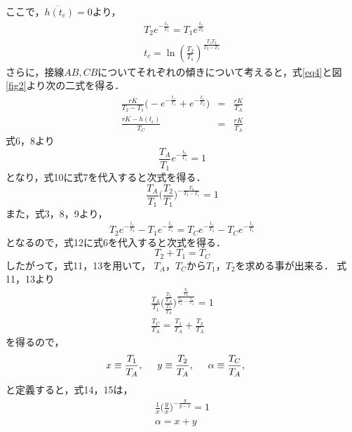 \documentclass[11pt,a4paper]{jsarticle}
\begin{document}
ここで，$\ddot{h(t_c)} = 0$より，
\begin{eqnarray}
 T_2 e^{-\frac{t_c}{T_1}} = T_1 e^{\frac{t_c}{T_2}} \\ \label{eq6}
t_c = \ln{(\frac{T_2}{T_1})}^{\frac{T_1 T_2}{T_2 - T_1}}
\end{eqnarray}
さらに，接線$AB, CB$についてそれぞれの傾きについて考えると，式\ref{eq4}と図\ref{fig2}より次の二式を得る．
\begin{eqnarray}
  \frac{r K}{T_2 - T_1} \biggl( - e^{- \frac{t_c}{T_1}} + e^{- \frac{t_c}{T_2}} \biggr) &=& \frac{r K}{T_A} \\
  \frac{r K - h(t_c)}{T_C} &=& \frac{r K}{T_A}
\end{eqnarray}
式6，8より
\begin{equation}
  \frac{T_A}{T_1} e^{- \frac{t_c}{T_1}} = 1
\end{equation}
となり，式10に式7を代入すると次式を得る．
\begin{equation}
  \frac{T_A}{T_1} \biggl( \frac{T_2}{T_1} \biggr) ^{- \frac{T_2}{T_2 - T_1}} = 1
\end{equation}
また，式3，8，9より，
\begin{equation}
  T_2 e^{- \frac{t_c}{T_2}} - T_1 e^{- \frac{t_c}{T_1}} = T_C e^{- \frac{t_c}{T_2}} - T_C e^{- \frac{t_c}{T_1}}
\end{equation}
となるので，式12に式6を代入すると次式を得る．
\begin{equation}
  T_2 + T_1 = T_C
\end{equation}
したがって，式11，13を用いて，
$T_A$，$T_C$から$T_1$，$T_2$を求める事が出来る．
式11，13より
\begin{eqnarray}
  \frac{T_A}{T_1} \biggl( \frac{\frac{T_2}{T_A}}{\frac{T_1}{T_A}} \biggr) ^{\frac{\frac{T_2}{T_A}}{\frac{T_2}{T_A} - \frac{T_1}{T_A}}} = 1 \\
  \frac{T_C}{T_A} = \frac{T_1}{T_A} + \frac{T_2}{T_A}
\end{eqnarray}
を得るので，
\begin{equation}
  x \equiv \frac{T_1}{T_A}, \hspace{5mm}
  y \equiv \frac{T_2}{T_A}, \hspace{5mm}
  \alpha \equiv \frac{T_C}{T_A}, \hspace{5mm}
\end{equation}
と定義すると，式14，15は，
\begin{eqnarray}
  \frac{1}{x} \biggl( \frac{y}{x} \biggr) ^{- \frac{y}{y - x}} = 1 \\
  \alpha = x + y
\end{eqnarray}
\end{document}

